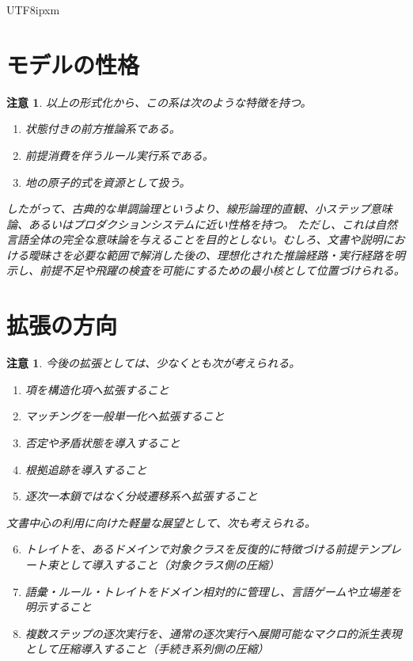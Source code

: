 \documentclass[a4paper,11pt]{bxjsarticle}
\newcommand{\JPCJKfamily}{ipxm}
\newtheorem{remark}[definition]{注意}
\begin{document}
\begin{CJK}{UTF8}{\JPCJKfamily}
\section{モデルの性格}

\begin{remark}
以上の形式化から、この系は次のような特徴を持つ。
\begin{enumerate}[label=\arabic*.]
\item 状態付きの前方推論系である。
\item 前提消費を伴うルール実行系である。
\item 地の原子的式を資源として扱う。
\end{enumerate}
したがって、古典的な単調論理というより、線形論理的直観、小ステップ意味論、あるいはプロダクションシステムに近い性格を持つ。
ただし、これは自然言語全体の完全な意味論を与えることを目的としない。むしろ、文書や説明における曖昧さを必要な範囲で解消した後の、理想化された推論経路・実行経路を明示し、前提不足や飛躍の検査を可能にするための最小核として位置づけられる。
\end{remark}

\section{拡張の方向}

\begin{remark}
今後の拡張としては、少なくとも次が考えられる。
\begin{enumerate}[label=\arabic*.]
\item 項を構造化項へ拡張すること
\item マッチングを一般単一化へ拡張すること
\item 否定や矛盾状態を導入すること
\item 根拠追跡を導入すること
\item 逐次一本鎖ではなく分岐遷移系へ拡張すること
\end{enumerate}
文書中心の利用に向けた軽量な展望として、次も考えられる。
\begin{enumerate}[label=\arabic*.]
\setcounter{enumi}{5}
\item トレイトを、あるドメインで対象クラスを反復的に特徴づける前提テンプレート束として導入すること（対象クラス側の圧縮）
\item 語彙・ルール・トレイトをドメイン相対的に管理し、言語ゲームや立場差を明示すること
\item 複数ステップの逐次実行を、通常の逐次実行へ展開可能なマクロ的派生表現として圧縮導入すること（手続き系列側の圧縮）
\end{enumerate}
\end{remark}

\ifPDFTeX
  \end{CJK}
\fi
\end{document}
